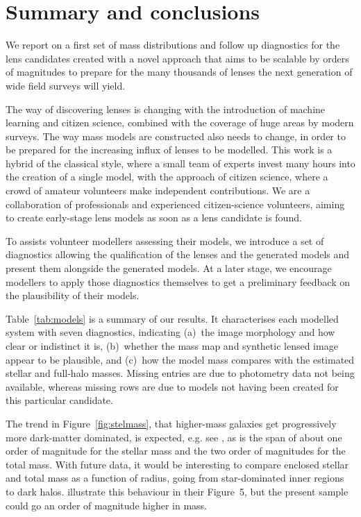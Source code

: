 \section{Summary and conclusions}\label{sec:summary}


We report on a first set of mass distributions and follow up diagnostics for 
the {\SW} lens candidates created with a novel approach that aims to be scalable 
by orders of magnitudes to prepare for the many thousands of lenses the next 
generation of wide field surveys will yield.

The way of discovering lenses is changing with the introduction of
machine learning and citizen science, combined with the coverage of
huge areas by modern surveys.  The way mass models are constructed also needs to
change, in order to be prepared for the increasing influx of lenses to
be modelled.  This work is a hybrid of the classical style, where a
small team of experts invest many hours into the creation of a single
model, with the approach of citizen science, where a crowd of amateur
volunteers make independent contributions.  We are a collaboration of
professionals and experienced citizen-science volunteers, aiming to
create early-stage lens models as soon as a lens candidate is found.

To assists volunteer modellers assessing their models, we introduce a
set of diagnostics allowing the qualification of the lenses and the
generated models and present them alongside the generated models. At a
later stage, we encourage modellers to apply those diagnostics
themselves to get a preliminary feedback on the plausibility of their
models.

Table~\ref{tab:models} is a summary of our results.  It characterises
each modelled system with seven diagnostics, indicating (a)~the image
morphology and how clear or indistinct it is, (b)~whether the mass map
and synthetic lensed image appear to be plausible, and (c)~how the
model mass compares with the estimated stellar and full-halo masses.
Missing entries are due to photometry data not being available, whereas
missing rows are due to models not having been created for this particular
candidate.



The trend in Figure~\ref{fig:stelmass}, that higher-mass galaxies get
progressively more dark-matter dominated, is expected,
e.g. see \cite{2005ApJ...623L...5F}, as is the span of about one order
of magnitude for the stellar mass and the two order of magnitudes for the total
mass.
With future data, it would be interesting to compare enclosed
stellar and total mass as a function of radius, going from
star-dominated inner regions to dark halos.
\cite{2011ApJ...740...97L} illustrate this behaviour in their
Figure~5, but the present sample could go an order of magnitude higher
in mass.

